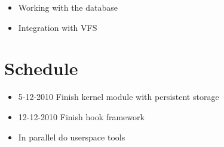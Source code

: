 \documentclass{beamer}
\begin{document}
\begin{frame}
\begin{itemize}
	\item Working with the database
	\item Integration with VFS
\end{itemize}
\end{frame}

\section{Schedule}

\begin{frame}
  \begin{itemize}
    \item 5-12-2010 Finish kernel module with persistent storage
    \item 12-12-2010 Finish hook framework
    \item In parallel do userspace tools
  \end{itemize}
\end{frame}
\end{document}
